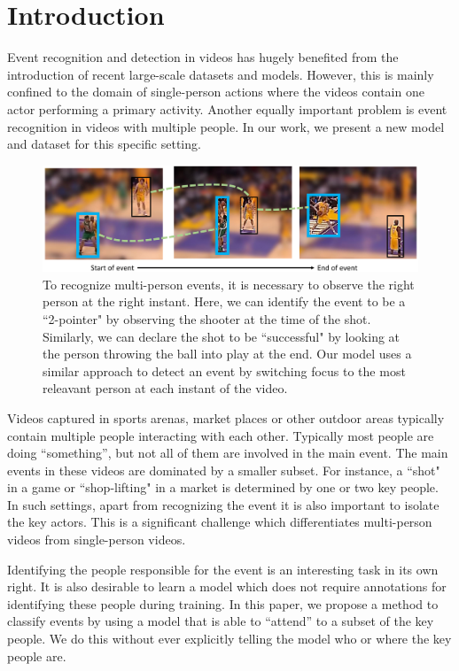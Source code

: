 \section{Introduction}

Event recognition and detection in videos has hugely benefited from the
introduction of recent large-scale datasets \cite{THUMOS,UCF101,Karpathy_CVPR14,MED11} and models.
However, this is mainly confined to the domain of single-person actions
where the videos contain one actor performing a primary activity.
Another equally important problem is event recognition in
videos with multiple people. In our work, we present a new model
and dataset for this specific setting.

\begin{figure}[ht!]
\begin{center}
  \includegraphics[width=3.5 in]{images/pull_figure_v2_cropped.pdf}
\end{center}
\caption{To recognize multi-person events, it is necessary to observe the right
person at the right instant. Here, we can identify the
event to be a ``2-pointer" by observing the shooter at the time of the shot.
Similarly, we can declare the shot to be ``successful" by looking at the
person throwing the ball into play at the end. Our model uses a similar approach to detect
an event by switching focus to the most releavant person at each instant of the video.}
\label{fig:pull_figure}
\end{figure}

Videos captured in sports arenas, market places or other outdoor areas
typically contain multiple people interacting with each other.
Typically most people are doing ``something'', but not all of them are involved in the main event.
The main events in these videos are dominated by a smaller subset. For instance, a ``shot" in a game
or ``shop-lifting" in a market is determined by one or two key people.
In such settings, apart from recognizing the event it is also important
to isolate the key actors. This is a significant challenge which
differentiates multi-person videos from single-person videos.

Identifying the people responsible for the event is an interesting task in its own right.
It is also desirable to learn a model which does not require annotations for identifying these people during
training. In this paper, we propose a method  to classify events by using
a model that is able to ``attend'' to a subset of the key people.
We  do this without ever explicitly telling the model who or where the
key people are. 

